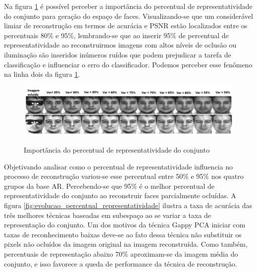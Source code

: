 Na figura \ref{fig:imp_variancia} é possível perceber a importância do percentual de representatividade do conjunto para geração do espaço de faces. Visualizando-se que um considerável limiar de  reconstrução em termos de acurácia e PSNR estão localizados entre os percentuais  80\% e 95\%, lembrando-se que ao inserir 95\% de percentual de representatividade ao reconstruirmos imagens com altos níveis de oclusão ou iluminação são inseridos inúmeros ruídos que podem prejudicar a tarefa de classificação e influenciar o erro do classificador. Podemos perceber esse fenômeno na linha dois da figura \ref{fig:imp_variancia}.

\begin{figure}[H]
\centering
\caption{Importância do percentual de representatividade do conjunto }
\includegraphics[scale=0.62]{imgs/imp_variancia.png}
\label{fig:imp_variancia}
\end{figure}



Objetivando analisar como o percentual de representatividade influencia no processo de reconstrução variou-se esse percentual entre 50\% e 95\% nos quatro grupos da base AR. Percebendo-se que 95\% é o melhor percentual de representatividade do conjunto ao reconstruir faces parcialmente ocluídas. A figura \ref{fig:evolucao_percentual_representatividade} ilustra a taxa de acurácia das três melhores técnicas baseadas em subespaço ao se variar a taxa de representação do conjunto. Um dos motivos da técnica Gappy PCA iniciar com taxas de reconhecimento baixas deve-se ao fato dessa técnica não substituir os pixels não ocluídos da imagem original na imagem reconstruída. Como também, percentuais de representação abaixo 70\% aproximam-se da imagem média do conjunto, e isso favorece a queda de performance da técnica de reconstrução.


